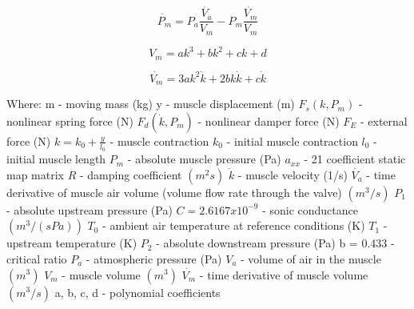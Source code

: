 \documentclass[11pt,a4paper]{article}
\begin{document}
\begin{appendices}
\begin{equation}
    \dot{P_m} = P_a\frac{\dot{V_a}}{V_m}-P_m\frac{\dot{V_m}}{V_m}
\end{equation}

\begin{equation}
    V_m = ak^3 + bk^2 + ck + d
\end{equation}

\begin{equation}
    \dot{V_m} = 3ak^2\dot{k} + 2bk\dot{k} + c\dot{k}
\end{equation}

Where: \newline
m - moving mass (kg)\newline
y - muscle displacement (m)\newline
$F_s(k, P_m)$ - nonlinear spring force (N)\newline
$F_d(\dot{k}, P_m)$ - nonlinear damper force (N)\newline
$F_E$ - external force (N)\newline
$k = k_0 + \frac{y}{l_0}$ - muscle contraction\newline
$k_0$ - initial muscle contraction\newline
$l_0$ - initial muscle length\newline
$P_m$ - absolute muscle pressure (Pa)\newline
$a_{xx}$ - 21 coefficient static map matrix\newline
$R$ - damping coefficient $(m^2s)$\newline
$\dot{k}$ - muscle velocity (1/s)\newline
$\dot{V_a}$ - time derivative of muscle air volume (volume flow rate through the valve) $(m^3/s)$
$P_1$ - absolute upstream pressure (Pa)\newline
$C = 2.6167x10^{-9}$ - sonic conductance $(m^3/(sPa))$\newline
$T_0$ - ambient air temperature at reference conditions (K)\newline
$T_1$ - upstream temperature (K)\newline
$P_2$ - absolute downstream pressure (Pa)\newline
b = 0.433 - critical ratio\newline
$P_a$ - atmospheric pressure (Pa)\newline
$V_a$ - volume of air in the muscle $(m^3)$\newline
$V_m$ - muscle volume $(m^3)$\newline
$\dot{V_m}$ - time derivative of muscle volume $(m^3/s)$\newline
a, b, c, d - polynomial coefficients


\end{appendices}
\end{document}
